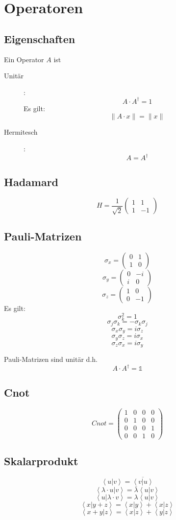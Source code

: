 \documentclass{article}
\begin{document}
\section{Operatoren}
\subsection{Eigenschaften}
Ein Operator $A$ ist
\begin{description}
\item[Unitär]:
  \[ A\cdot A^\dagger = 1 \]
  Es gilt:
  \[ \| A\cdot x \| = \| x \| \]
\item[Hermitesch]:
  \[ A = A^\dagger \]
\end{description}
\subsection{Hadamard}

\[ H = \frac{1}{\sqrt{2}}\left(\begin{array}{rr}
    1 &  1\\
    1 & -1
  \end{array}\right) \]
\subsection{Pauli-Matrizen}
\[ \sigma_x = \left(\begin{array}{rr}
    0 & 1\\
    1 & 0
  \end{array} \right) \]
\[ \sigma_y = \left(\begin{array}{rr}
    0 & -i\\
    i & 0
  \end{array} \right) \]
\[ \sigma_z = \left(\begin{array}{rr}
    1 & 0\\
    0 & -1
  \end{array}\right) \]
Es gilt:
\[ \sigma_k^2 = 1 \]
\[ \sigma_j\sigma_k = -\sigma_k\sigma_j \]
\[ \sigma_x\sigma_y = i\sigma_z \]
\[ \sigma_y\sigma_z = i\sigma_x \]
\[ \sigma_z\sigma_x = i\sigma_y \]

Pauli-Matrizen sind unitär d.h. 
\[ A \cdot A^{\dagger} = \mathbb{1} \]
\subsection{Cnot}
\[ Cnot = \left(\begin{array}{rrrr}
    1 & 0 & 0 & 0\\
    0 & 1 & 0 & 0\\
    0 & 0 & 0 & 1\\
    0 & 0 & 1 & 0
  \end{array}\right) \]

\subsection{Skalarprodukt}
\[ \left<u|v\right> = \overline{\left<v|u\right>} \]
\[ \left<\lambda\cdot u|v\right> = \overline{\lambda}\left<u|v\right> \]
\[ \left<u|\lambda\cdot v\right> = \lambda\left<u|v\right> \]
\[ \left<x|y+z\right> = \left<x|y\right> + \left<x|z\right> \]
\[ \left<x+y|z\right> = \left<x|z\right> + \left<y|z\right> \]
\end{document}
